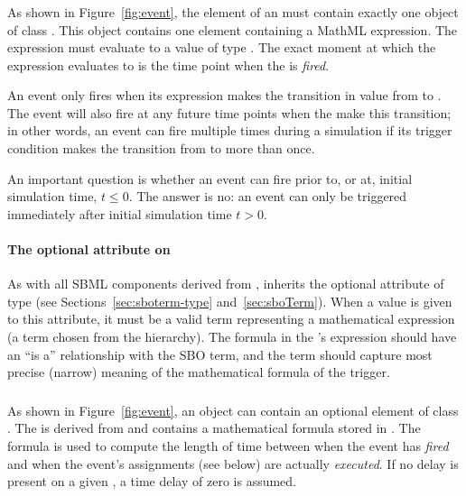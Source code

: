 \subsubsection{}
\label{sec:trigger}
\label{sec:event-trigger}

As shown in Figure~\ref{fig:event}, the  element of
an \Event must contain exactly one object of class \Trigger.  This
object contains one  element containing a MathML
expression.  The expression must evaluate to a value of type
.  The exact moment at which the expression
evaluates to  is the time point when the \Event is
\emph{fired}.

An event only fires when its \Trigger expression makes the
transition in value from  to .  The event
will also fire at any future time points when the 
make this transition; in other words, an event can fire multiple
times during a simulation if its trigger condition makes the
transition from  to  more than once.

An important question is whether an event can fire prior to, or
at, initial simulation time, \ie $t \leq 0$.  The answer is no: an
event can only be triggered immediately after initial simulation
time \ie $t > 0$.


\paragraph{The optional  attribute on }
\label{sec:trigger-sboterm}

As with all SBML components derived from \SBase, \Trigger inherits
the optional attribute  of type
 (see Sections~\ref{sec:sboterm-type}
and~\ref{sec:sboTerm}).  When a value is given to this
attribute, it must be a valid term representing a
mathematical expression (\ie a term chosen from the
\sbomathformula hierarchy).  The formula in the \Trigger's
 expression should have an ``is a'' relationship with
the SBO term, and the term should capture most precise (narrow)
meaning of the mathematical formula of the trigger.


\subsubsection{}
\label{sec:event-delay}

As shown in Figure~\ref{fig:event}, an \Event object can contain
an optional  element of class \Delay.  The \Delay is
derived from \SBase and contains a mathematical formula stored in
.  The formula is used to compute the length of time
between when the event has \emph{fired} and when the event's
assignments (see below) are actually \emph{executed}.  If no delay
is present on a given \Event, a time delay of zero is assumed.

